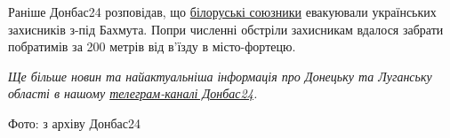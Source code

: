
Раніше Донбас24 розповідав, що
\href{https://donbas24.news/news/biloruski-soyuzniki-evakuyuvali-ukrayinskix-zaxisnikiv-z-pid-baxmuta-video}{білоруські
союзники} евакуювали українських захисників з-під Бахмута. Попри численні
обстріли захисникам вдалося забрати побратимів за 200 метрів від в'їзду в
місто-фортецю.

\emph{Ще більше новин та найактуальніша інформація про Донецьку та Луганську області
в нашому \href{https://t.me/donbas24}{телеграм-каналі Донбас24}.}

Фото: з архіву Донбас24
